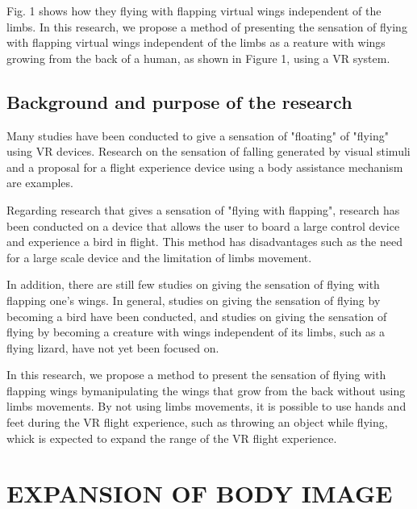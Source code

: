 \documentclass[letterpaper, 10 pt, conference]{ieeeconf}  %
\begin{document}
        Fig. 1 shows how they flying  with flapping virtual wings independent of the limbs.  
        In this research, we propose a method of presenting the sensation of flying with flapping virtual wings independent of the limbs as a reature with wings growing from the back of a human, as shown in Figure 1, using a VR system.  

        \subsection{Background and purpose of the research}
                
                Many studies have been conducted to give a sensation of "floating" of "flying" using VR devices.  
                Research on the sensation of falling generated by visual stimuli
                and a proposal for a flight experience device using a body assistance mechanism
                are examples.  

                Regarding research that gives a sensation of "flying with flapping", research has been conducted on a device that allows the user to board a large control device and experience a bird in flight.
                \cite{rheiner2014birdly}
                This method has  disadvantages such as the need for a large scale device and the limitation of limbs movement.  

                In addition, there are still few studies on giving the sensation of flying with flapping one's wings.  
                In general, studies on giving the sensation of flying by becoming a bird have been conducted, and studies on giving the sensation of flying by becoming a creature with wings independent of its limbs, such as a flying lizard, have not yet been focused on.

                In this research, we propose a method to present the sensation of flying with flapping wings bymanipulating the wings that grow from the back without using limbs movements.
                By not using limbs movements, it is possible to use hands and feet during the VR flight experience, such as throwing an object while flying, whick is expected to expand the range of the VR flight experience.

\section{EXPANSION OF BODY IMAGE}
\end{document}
